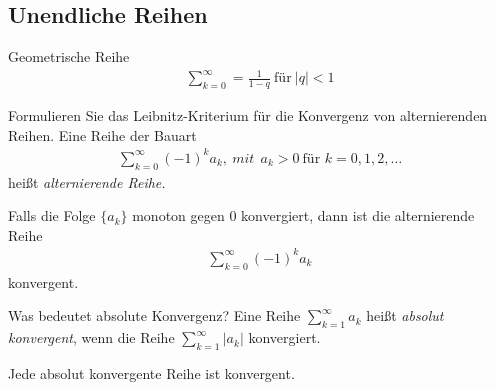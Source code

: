 \subsection{Unendliche Reihen}
\begin{karte}{Geometrische Reihe}
	\begin{align}
		\sum_{k=0}^{\infty} =\frac{1}{1-q}\ \text{für} \ \lvert q\rvert < 1
	\end{align}
\end{karte}

\begin{karte}{Formulieren Sie das Leibnitz-Kriterium für die Konvergenz von alternierenden Reihen.}
	{\large Eine Reihe der Bauart
		\begin{align}
			\sum_{k=0}^{\infty} {(-1)}^{k} a_k, \ mit \ \ a_k > 0\ \text{für }k=0,1,2,\dots
		\end{align}
		heißt \emph{alternierende Reihe.}}\vspace{5mm}\par
	Falls die Folge \( \{ a_k \} \) monoton gegen 0 konvergiert, dann ist die alternierende Reihe
	\begin{align}
		\sum_{k=0}^{\infty}{(-1)}^k a_k
	\end{align}
	konvergent.
\end{karte}

\begin{karte}{Was bedeutet absolute Konvergenz?}
	Eine Reihe \(\sum_{k=1}^{\infty}a_k\) heißt \emph{absolut konvergent}, wenn die Reihe \(\sum_{k=1}^{\infty}\lvert a_k \rvert \) konvergiert. \vspace{5mm}\par
	Jede absolut konvergente Reihe ist konvergent.
\end{karte}

